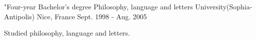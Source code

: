 

\begin{cventries}

  \cventry
    {"Four-year Bachelor's degree Philosophy, language and letters} %
    {University(Sophia-Antipolis)} %
    {Nice, France} %
    {Sept. 1998 - Aug. 2005} %
    {
      \begin{cvitems} %
        \item {Studied philosophy, language and letters.}
      \end{cvitems}
    }

\end{cventries}
